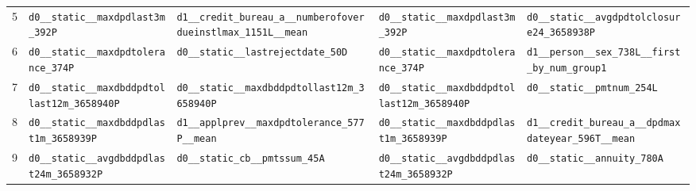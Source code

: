\documentclass[final,5p,twocolumn]{elsarticle}
\begin{document}
\begin{table}[htbp]
\begin{threeparttable}
\begin{tabular}{@{}rL{40mm}L{40mm}L{40mm}L{40mm}@{}}
5 & \texttt{d0\_\allowbreak \_\allowbreak static\_\allowbreak \_\allowbreak maxdpdlast3m\_\allowbreak 392P} & \texttt{d1\_\allowbreak \_\allowbreak credit\_\allowbreak bureau\_\allowbreak a\_\allowbreak \_\allowbreak numberofoverdueinstlmax\_\allowbreak 1151L\_\allowbreak \_\allowbreak mean} & \texttt{d0\_\allowbreak \_\allowbreak static\_\allowbreak \_\allowbreak maxdpdlast3m\_\allowbreak 392P} & \texttt{d0\_\allowbreak \_\allowbreak static\_\allowbreak \_\allowbreak avgdpdtolclosure24\_\allowbreak 3658938P} \\
6 & \texttt{d0\_\allowbreak \_\allowbreak static\_\allowbreak \_\allowbreak maxdpdtolerance\_\allowbreak 374P} & \texttt{d0\_\allowbreak \_\allowbreak static\_\allowbreak \_\allowbreak lastrejectdate\_\allowbreak 50D} & \texttt{d0\_\allowbreak \_\allowbreak static\_\allowbreak \_\allowbreak maxdpdtolerance\_\allowbreak 374P} & \texttt{d1\_\allowbreak \_\allowbreak person\_\allowbreak \_\allowbreak sex\_\allowbreak 738L\_\allowbreak \_\allowbreak first\_\allowbreak by\_\allowbreak num\_\allowbreak group1} \\
7 & \texttt{d0\_\allowbreak \_\allowbreak static\_\allowbreak \_\allowbreak maxdbddpdtollast12m\_\allowbreak 3658940P} & \texttt{d0\_\allowbreak \_\allowbreak static\_\allowbreak \_\allowbreak maxdbddpdtollast12m\_\allowbreak 3658940P} & \texttt{d0\_\allowbreak \_\allowbreak static\_\allowbreak \_\allowbreak maxdbddpdtollast12m\_\allowbreak 3658940P} & \texttt{d0\_\allowbreak \_\allowbreak static\_\allowbreak \_\allowbreak pmtnum\_\allowbreak 254L} \\
8 & \texttt{d0\_\allowbreak \_\allowbreak static\_\allowbreak \_\allowbreak maxdbddpdlast1m\_\allowbreak 3658939P} & \texttt{d1\_\allowbreak \_\allowbreak applprev\_\allowbreak \_\allowbreak maxdpdtolerance\_\allowbreak 577P\_\allowbreak \_\allowbreak mean} & \texttt{d0\_\allowbreak \_\allowbreak static\_\allowbreak \_\allowbreak maxdbddpdlast1m\_\allowbreak 3658939P} & \texttt{d1\_\allowbreak \_\allowbreak credit\_\allowbreak bureau\_\allowbreak a\_\allowbreak \_\allowbreak dpdmaxdateyear\_\allowbreak 596T\_\allowbreak \_\allowbreak mean} \\
9 & \texttt{d0\_\allowbreak \_\allowbreak static\_\allowbreak \_\allowbreak avgdbddpdlast24m\_\allowbreak 3658932P} & \texttt{d0\_\allowbreak \_\allowbreak static\_\allowbreak cb\_\allowbreak \_\allowbreak pmtssum\_\allowbreak 45A} & \texttt{d0\_\allowbreak \_\allowbreak static\_\allowbreak \_\allowbreak avgdbddpdlast24m\_\allowbreak 3658932P} & \texttt{d0\_\allowbreak \_\allowbreak static\_\allowbreak \_\allowbreak annuity\_\allowbreak 780A} \\

\end{tabular}
\end{threeparttable}
\end{table}
\end{document}
